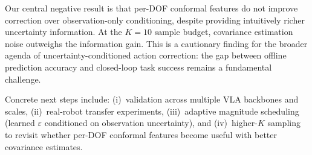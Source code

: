 Our central negative result is that per-DOF conformal features do not improve correction over observation-only conditioning, despite providing intuitively richer uncertainty information.
At the $K{=}10$ sample budget, covariance estimation noise outweighs the information gain.
This is a cautionary finding for the broader agenda of uncertainty-conditioned action correction: the gap between offline prediction accuracy and closed-loop task success remains a fundamental challenge.

Concrete next steps include: (i)~validation across multiple VLA backbones and scales, (ii)~real-robot transfer experiments, (iii)~adaptive magnitude scheduling (learned $\varepsilon$ conditioned on observation uncertainty), and (iv)~higher-$K$ sampling to revisit whether per-DOF conformal features become useful with better covariance estimates.
